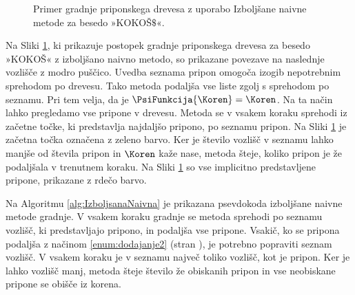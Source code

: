 \begin{figure}[tb]
       \caption{Primer gradnje priponskega drevesa z uporabo Izboljšane naivne metode za besedo »KOKOŠ$\$$«.} 
        \label{fig:IzbolšanaNaivna}
\end{figure}

Na Sliki \ref{fig:IzbolšanaNaivna}, ki prikazuje postopek gradnje priponskega drevesa za besedo »KOKOŠ« z izboljšano naivno metodo, so prikazane povezave na naslednje vozlišče z modro puščico. Uvedba seznama pripon omogoča izogib nepotrebnim sprehodom po drevesu. Tako metoda podaljša vse liste zgolj s sprehodom po seznamu. Pri tem velja, da je $\PsiFunkcija{\Koren}=\Koren$. Na ta način lahko pregledamo vse pripone v drevesu. Metoda se v vsakem koraku sprehodi iz začetne točke, ki predstavlja najdaljšo pripono, po seznamu pripon. Na Sliki \ref{fig:IzbolšanaNaivna} je začetna točka označena z zeleno barvo. Ker je število vozlišč v seznamu lahko manjše od števila pripon in $\Koren$ kaže nase, metoda šteje, koliko pripon je že podaljšala v trenutnem koraku. Na Sliki \ref{fig:IzbolšanaNaivna} so vse implicitno predstavljene pripone, prikazane z rdečo barvo.

Na Algoritmu \ref{alg:IzboljsanaNaivna} je prikazana psevdokoda izboljšane naivne metode gradnje. V vsakem koraku gradnje se metoda sprehodi po seznamu vozlišč, ki predstavljajo pripono, in podaljša vse pripone. Vsakič, ko se pripona podaljša z načinom \ref{enum:dodajanje2} (stran \pageref{par:naciniDodajanja}), je potrebno popraviti seznam vozlišč. V vsakem koraku je v seznamu največ toliko vozlišč, kot je pripon. Ker je lahko vozlišč manj, metoda šteje število že obiskanih pripon in vse neobiskane pripone se obišče iz korena.

